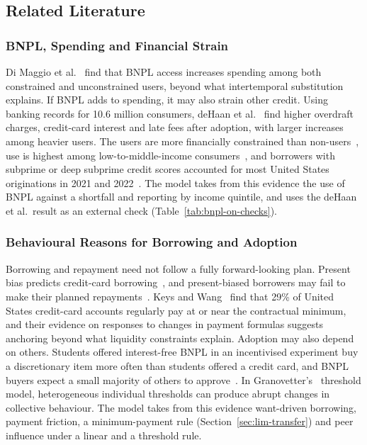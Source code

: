 \subsection{Related Literature}
\label{sec:literature}

\subsubsection*{BNPL, Spending and Financial Strain}
\label{sec:lit-bnpl}

Di Maggio et al.~\citeyearpar{dimaggio2022bnpl} find that \ac{BNPL} access increases spending among
both constrained and unconstrained users, beyond what intertemporal substitution explains. If
\ac{BNPL} adds to spending, it may also strain other credit. Using banking records for 10.6 million
consumers, deHaan et al.~\citeyearpar{dehaan2024bnpl} find higher overdraft charges, credit-card
interest and late fees after adoption, with larger increases among heavier users. The users are
more financially constrained than non-users~\citep{hayashi2025constraints}, use is highest among
low-to-middle-income consumers~\citep{dimaggio2022bnpl}, and borrowers with subprime or deep
subprime credit scores accounted for most United States originations in 2021 and
2022~\citep[p.~2]{cfpb2025bnpl}. The model takes from this evidence the use of \ac{BNPL} against a
shortfall and reporting by income quintile, and uses the deHaan et al.\ result as an external check
(Table~\ref{tab:bnpl-on-checks}).

\subsubsection*{Behavioural Reasons for Borrowing and Adoption}
\label{sec:lit-behavioural}

Borrowing and repayment need not follow a fully forward-looking plan. Present bias predicts
credit-card borrowing~\citep{meier2010present}, and present-biased borrowers may fail to make their
planned repayments~\citep{Kuchler2021}. Keys and Wang~\citeyearpar{Keys2019} find that 29\% of
United States credit-card accounts regularly pay at or near the contractual minimum, and their
evidence on responses to changes in payment formulas suggests anchoring beyond what liquidity
constraints explain. Adoption may also depend on others. Students offered interest-free \ac{BNPL} in an incentivised experiment
buy a discretionary item more often than students offered a credit card, and \ac{BNPL} buyers
expect a small majority of others to approve~\citep{ackert2025bnpl}. In
Granovetter's~\citeyearpar{granovetter1978threshold} threshold model, heterogeneous individual
thresholds can produce abrupt changes in collective behaviour. The model takes from this evidence
want-driven borrowing, payment friction, a minimum-payment rule (Section~\ref{sec:lim-transfer})
and peer influence under a linear and a threshold rule.

